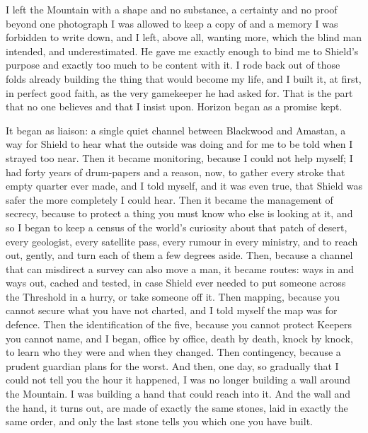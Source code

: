 I left the Mountain with a shape and no substance, a certainty and no proof beyond one photograph I was allowed to keep a copy of and a memory I was forbidden to write down, and I left, above all, wanting more, which the blind man intended, and underestimated. He gave me exactly enough to bind me to Shield's purpose and exactly too much to be content with it. I rode back out of those folds already building the thing that would become my life, and I built it, at first, in perfect good faith, as the very gamekeeper he had asked for. That is the part that no one believes and that I insist upon. Horizon began as a promise kept.\par

It began as liaison: a single quiet channel between Blackwood and Amastan, a way for Shield to hear what the outside was doing and for me to be told when I strayed too near. Then it became monitoring, because I could not help myself; I had forty years of drum-papers and a reason, now, to gather every stroke that empty quarter ever made, and I told myself, and it was even true, that Shield was safer the more completely I could hear. Then it became the management of secrecy, because to protect a thing you must know who else is looking at it, and so I began to keep a census of the world's curiosity about that patch of desert, every geologist, every satellite pass, every rumour in every ministry, and to reach out, gently, and turn each of them a few degrees aside. Then, because a channel that can misdirect a survey can also move a man, it became routes: ways in and ways out, cached and tested, in case Shield ever needed to put someone across the Threshold in a hurry, or take someone off it. Then mapping, because you cannot secure what you have not charted, and I told myself the map was for defence. Then the identification of the five, because you cannot protect Keepers you cannot name, and I began, office by office, death by death, knock by knock, to learn who they were and when they changed. Then contingency, because a prudent guardian plans for the worst. And then, one day, so gradually that I could not tell you the hour it happened, I was no longer building a wall around the Mountain. I was building a hand that could reach into it. And the wall and the hand, it turns out, are made of exactly the same stones, laid in exactly the same order, and only the last stone tells you which one you have built.\par

